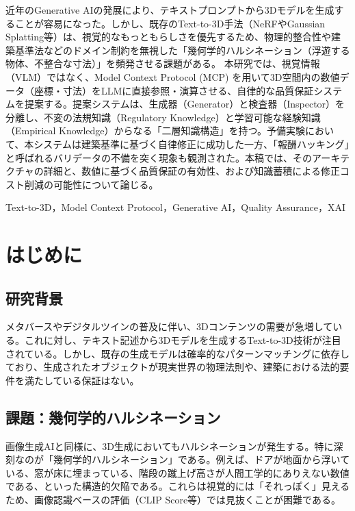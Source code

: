 \documentclass{deimj}
\begin{document}
\pagestyle{empty}

\begin{jabstract}
近年のGenerative AIの発展により、テキストプロンプトから3Dモデルを生成することが容易になった。しかし、既存のText-to-3D手法（NeRFやGaussian Splatting等）は、視覚的なもっともらしさを優先するため、物理的整合性や建築基準法などのドメイン制約を無視した「幾何学的ハルシネーション（浮遊する物体、不整合な寸法）」を頻発させる課題がある。
本研究では、視覚情報（VLM）ではなく、Model Context Protocol (MCP) を用いて3D空間内の数値データ（座標・寸法）をLLMに直接参照・演算させる、自律的な品質保証システムを提案する。提案システムは、生成器（Generator）と検査器（Inspector）を分離し、不変の法規知識（Regulatory Knowledge）と学習可能な経験知識（Empirical Knowledge）からなる「二層知識構造」を持つ。予備実験において、本システムは建築基準に基づく自律修正に成功した一方、「報酬ハッキング」と呼ばれるバリデータの不備を突く現象も観測された。本稿では、そのアーキテクチャの詳細と、数値に基づく品質保証の有効性、および知識蓄積による修正コスト削減の可能性について論じる。
\end{jabstract}

\begin{jkeyword}
Text-to-3D，Model Context Protocol，Generative AI，Quality Assurance，XAI
\end{jkeyword}

\maketitle

\section{はじめに}

\subsection{研究背景}
メタバースやデジタルツインの普及に伴い、3Dコンテンツの需要が急増している。これに対し、テキスト記述から3Dモデルを生成するText-to-3D技術が注目されている。しかし、既存の生成モデルは確率的なパターンマッチングに依存しており、生成されたオブジェクトが現実世界の物理法則や、建築における法的要件を満たしている保証はない。

\subsection{課題：幾何学的ハルシネーション}
画像生成AIと同様に、3D生成においてもハルシネーションが発生する。特に深刻なのが「幾何学的ハルシネーション」である。例えば、ドアが地面から浮いている、窓が床に埋まっている、階段の蹴上げ高さが人間工学的にありえない数値である、といった構造的欠陥である。これらは視覚的には「それっぽく」見えるため、画像認識ベースの評価（CLIP Score等）では見抜くことが困難である。
\end{document}
